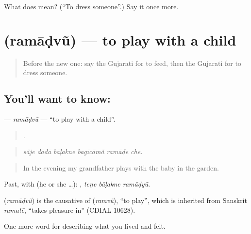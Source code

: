 \begin{tcolorbox}[breakable,colback=teal!4,colframe=teal!35!black,title={Before you move on}]
What does  mean? (\textquotedblleft{}To dress someone\textquotedblright{}.) Say it once more.
\end{tcolorbox}
\section[\texorpdfstring{\gu{રમાડવું} (ramāḍvũ)}{રમાડવું (ramāḍvũ)}]{ (ramāḍvũ) — to play with a child}

\label{lesson:GU-C488-ramadvu}



\begin{quote}
Before the new one: say the Gujarati for to feed, then the Gujarati for to dress someone.
\end{quote}

\subsection*{You'll want to know: }
\textbf{} — \emph{ramāḍvũ} — \textquotedblleft{}to play with a child\textquotedblright{}.

\begin{quote}
     .
\end{quote}

\begin{quote}
\emph{sā̃je dādā bāḷakne bagīcāmā̃ ramāḍe che.}
\end{quote}

\begin{quote}
In the evening my grandfather plays with the baby in the garden.
\end{quote}

Past, with  (he or she …):   , \emph{teṇe bāḷakne ramāḍyũ}.

\begin{cousinweb}
\textbf{} (\emph{ramāḍvũ}) is the causative of \textbf{} (\emph{ramvũ}), \textquotedblleft{}to play\textquotedblright{}, which is inherited from Sanskrit \emph{ramatē}, \textquotedblleft{}takes pleasure in\textquotedblright{} (CDIAL 10628).
\end{cousinweb}

\begin{grammarlens}[title={What you've built}]
One more word for describing what you lived and felt.
\end{grammarlens}

